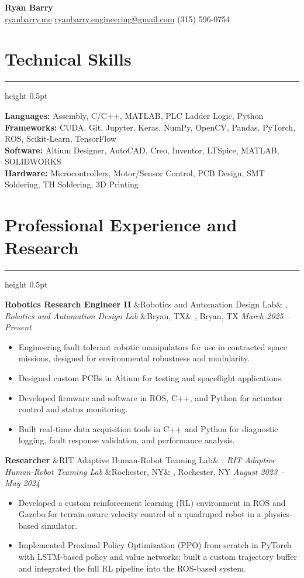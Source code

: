 \documentclass[letterpaper,10pt]{article}
\newcommand{\heading}[1]{%
    \vspace{-5mm} %
    \section*{#1}%
    \vspace{-3mm}%
    \noindent\hrule height 0.5pt %
    \vspace{4mm}%
}
\newcommand{\experience}[5]{%
    \vspace{-1mm}%
    \noindent\textbf{#1}%
    \ifx&#2&
    \else
        , \textit{#2}%
    \fi
    \ifx&#3&
    \else
        , #3%
    \fi
    \hfill \textit{#4} \\
    \vspace{-6.8mm}%
    \begin{itemize}[itemsep=-5pt]
        \setlength{\itemindent}{0em}
        #5
    \end{itemize}
}
\begin{document}
\begin{center}
    \vspace{-5mm} 
    \textbf{\huge Ryan Barry} \\
    \vspace{1mm}
    \href{http://ryanbarry.me}{ryanbarry.me}
    \hspace{0.2em} \vline \hspace{0.2em}
    \href{mailto:ryanbarry.engineering@gmail.com}{ryanbarry.engineering@gmail.com}
    \hspace{0.2em} \vline \hspace{0.2em}
    (315) 596-0754
\end{center}

\vspace{-3mm} %


\heading{Technical Skills}
\vspace{-1mm}%
\noindent\textbf{Languages:} Assembly, C/C++, MATLAB, PLC Ladder Logic, Python \\
\textbf{Frameworks:} CUDA, Git, Jupyter, Keras, NumPy, OpenCV, Pandas, PyTorch, ROS, Scikit-Learn, TensorFlow \\
\textbf{Software:} Altium Designer, AutoCAD, Creo, Inventor, LTSpice, MATLAB, SOLIDWORKS \\
\textbf{Hardware:} Microcontrollers, Motor/Sensor Control, PCB Design, SMT Soldering, TH Soldering, 3D Printing


\heading{Professional Experience and Research}

\experience
    {Robotics Research Engineer II}
    {Robotics and Automation Design Lab}
    {Bryan, TX}
    {March 2025 – Present}
    {
        \item Engineering fault tolerant robotic manipulators for use in contracted space missions, designed for environmental robustness and modularity.
        \item Designed custom PCBs in Altium for testing and spaceflight applications.
        \item Developed firmware and software in ROS, C++, and Python for actuator control and status monitoring.
        \item Built real-time data acquisition tools in C++ and Python for diagnostic logging, fault response validation, and performance analysis.
    }

\experience
    {Researcher}
    {RIT Adaptive Human-Robot Teaming Lab}
    {Rochester, NY}
    {August 2023 – May 2024}
    {
        \item  Developed a custom reinforcement learning (RL) environment in ROS and Gazebo for terrain-aware velocity control of a quadruped robot in a physics-based simulator.
        \item  Implemented Proximal Policy Optimization (PPO) from scratch in PyTorch with LSTM-based policy and value networks; built a custom trajectory buffer and integrated the full RL pipeline into the ROS-based system.
    }
    
\end{document}
